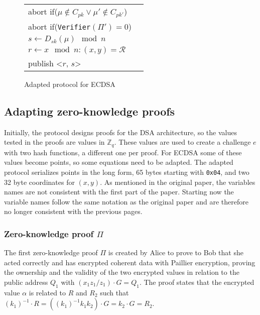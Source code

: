 \begin{figure}[H]
\begin{table}[H]
\begin{footnotesize}
{\begin{tabular}{ | l l | }
        abort if($\mu \notin C_{pk} \lor \mu' \notin C_{pk'}$) & \\
        abort if(\texttt{Verifier}$(\Pi') = 0$) & \\
        $s \leftarrow D_{sk}(\mu) \mod n$ & \\
        $r \leftarrow x \mod n : (x,y) = \mathcal{R}$ & \\
        publish <$r$, $s$> & \\
        \hline
      \end{tabular}}
      \end{footnotesize}
    \end{table}

  \caption{Adapted protocol for ECDSA}
  \label{fig:adaptationSchemeECDSA}
\end{figure}

\subsection{Adapting zero-knowledge proofs}

Initially, the protocol designs proofs for the DSA architecture, so the values
tested in the proofs are values in $\mathbb{Z}_{q}$. These values are used to
create a challenge $e$ with two hash functions, a different one per proof. For
ECDSA some of these values become points, so some equations need to be adapted.
The adapted protocol serializes points in the long form, 65 bytes starting with
\texttt{0x04}, and two 32 byte coordinates for $(x, y)$. As mentioned in the
original paper, the variables names are not consistent with the first part of
the paper. Starting now the variable names follow the same notation as the
original paper and are therefore no longer consistent with the previous pages.

\subsubsection{Zero-knowledge proof $\Pi$}

The first zero-knowledge proof $\Pi$ is created by Alice to prove to Bob that
she acted correctly and has encrypted coherent data with Paillier encryption,
proving the ownership and the validity of the two encrypted values in relation
to the public address $Q_1$ with $(x_1z_1 / z_1) \cdot G = Q_1$. The proof
states that the encrypted value $\alpha$ is related to $R$ and $R_2$ such that
$(k_1)^{-1} \cdot R = ((k_1)^{-1}k_1k_2) \cdot G = k_2 \cdot G = R_2$.

